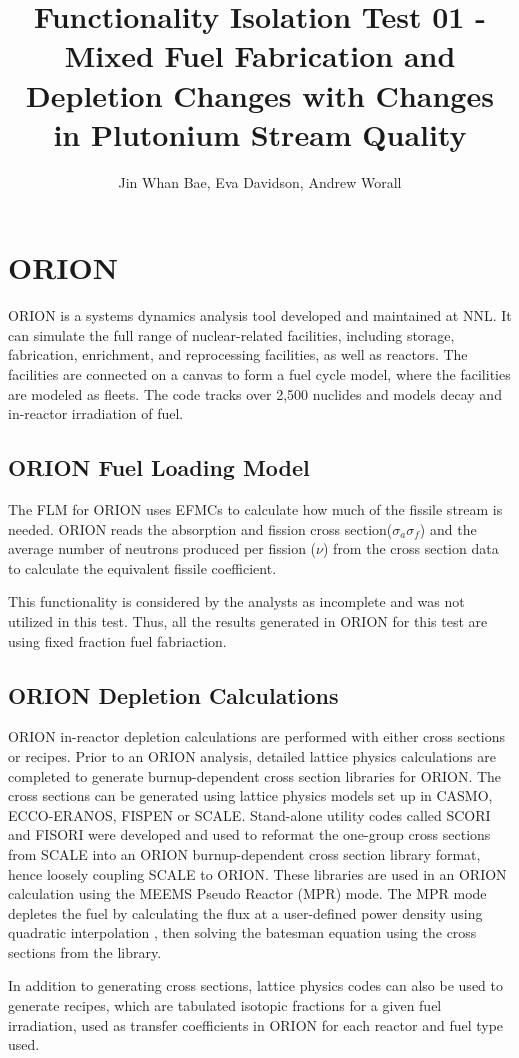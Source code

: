 \documentclass{report}
\title{Functionality Isolation Test 01 - Mixed Fuel Fabrication and Depletion Changes with
        Changes in Plutonium Stream Quality}
\author{Jin Whan Bae, Eva Davidson, Andrew Worall}
\institute{\underline{}
Oak Ridge National Laboratory
\and
Oak Ridge, TN
}
\begin{document}
\section{ORION}
ORION \cite{gregg_benefits_2013} is a systems dynamics analysis tool developed and maintained at \gls{NNL}.
It can simulate the full range of nuclear-related facilities, including storage, fabrication, enrichment,
and reprocessing facilities, as well as reactors. The facilities are connected on a canvas to form a
fuel cycle model, where the facilities are modeled as fleets. The code tracks over 2,500 nuclides
and models decay and in-reactor irradiation of fuel.

\subsection{ORION Fuel Loading Model}
The \gls{FLM} for ORION uses \glspl{EFMC} to calculate how much of the fissile stream is needed. ORION reads
the absorption and fission cross section($\sigma_a \sigma_f$) and the average number of neutrons produced per fission ($\nu$)
from the cross section data to calculate the equivalent fissile coefficient.

This functionality is considered by the analysts as incomplete and was not utilized in this test. Thus, all the results
generated in ORION for this test are using fixed fraction fuel fabriaction.

\subsection{ORION Depletion Calculations}
ORION in-reactor depletion calculations are performed with either cross sections or recipes.
Prior to an ORION analysis, detailed lattice physics calculations are completed to generate burnup-dependent
cross section libraries for ORION. The cross sections can be generated using lattice physics models set up in CASMO,
ECCO-ERANOS, FISPEN or SCALE. Stand-alone utility codes called SCORI and FISORI were developed and used to reformat
the one-group cross sections from SCALE into an ORION burnup-dependent cross section library format, hence loosely
coupling SCALE to ORION. These libraries are used in an ORION calculation using the MEEMS Pseudo Reactor (MPR) mode.
The MPR mode depletes the fuel by calculating the flux at a user-defined power density using quadratic interpolation
, then solving the batesman equation using the cross sections from the library. 

In addition to generating cross sections, lattice physics codes can also be used to generate recipes, which are
tabulated isotopic fractions for a given fuel irradiation, used as transfer coefficients in ORION for each 
reactor and fuel type used. 
\end{document}
